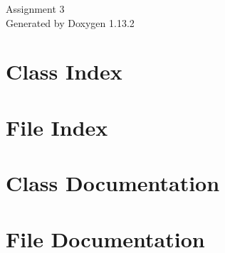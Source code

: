 \documentclass[twoside]{book}
\newcommand{\+}{\discretionary{\mbox{\scriptsize$\hookleftarrow$}}{}{}}
\newcommand{\clearemptydoublepage}{%
    \newpage{\pagestyle{empty}\cleardoublepage}%
  }
\begin{document}
  \raggedbottom
    \hypersetup{pageanchor=false,
                bookmarksnumbered=true,
                pdfencoding=unicode
               }
  \begin{titlepage}
  \vspace*{7cm}
  \begin{center}%
  {\Large Assignment 3}\\
  \vspace*{1cm}
  {\large Generated by Doxygen 1.13.2}\\
  \end{center}
  \end{titlepage}
  \clearemptydoublepage
  \tableofcontents
  \clearemptydoublepage
  \hypersetup{pageanchor=true}
\chapter{Class Index}

\chapter{File Index}

\chapter{Class Documentation}


\chapter{File Documentation}



















  \backmatter
  \newpage
  \clearemptydoublepage
  \printindex
\end{document}
